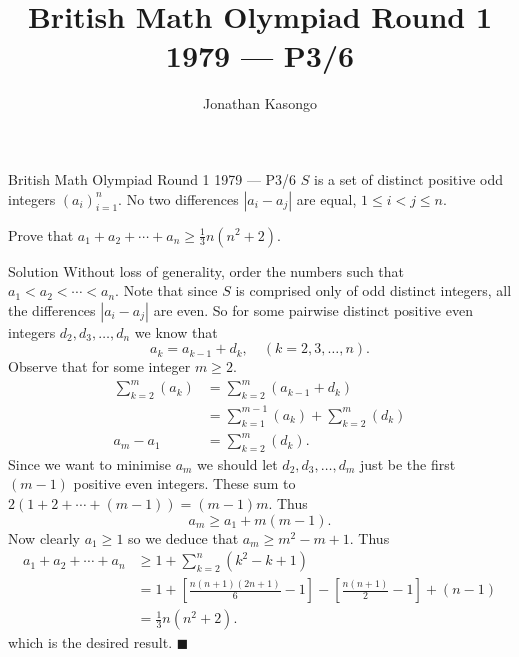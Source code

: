 \documentclass{article}
\author{Jonathan Kasongo}
\title{British Math Olympiad Round 1 1979 --- P3/6}
\begin{document}
\maketitle

\begin{problem}{British Math Olympiad Round 1 1979 --- P3/6}
$S$ is a set of distinct positive odd integers $(a_i)_{i=1}^n$. No
two differences $|a_i - a_j|$ are equal, $1 \leq i < j \leq n$.
\vspace{0.2cm}

Prove that $a_1 + a_2 + \cdots + a_n \geq \frac13 n (n^2 + 2)$.
\end{problem}

\begin{solution}{Solution}
Without loss of generality, order the numbers such that
$a_1 < a_2 < \cdots < a_n$.
Note that since $S$ is comprised only of odd distinct integers, all the
differences $|a_i - a_j|$ are even. So for some pairwise distinct positive
even integers $d_2, d_3, \ldots, d_n$ we know that
$$
a_k = a_{k-1} + d_k, \quad (k=2,3,\ldots,n).
$$
Observe that for some integer $m \geq 2$.
\[
\begin{aligned}
\sum_{k=2}^m (a_k) &= \sum_{k=2}^m (a_{k-1} + d_k) \\
&= \sum_{k=1}^{m-1} (a_k) + \sum_{k=2}^m (d_k) \\
a_m - a_1 &= \sum_{k=2}^m (d_k).
\end{aligned}
\]
Since we want to minimise $a_m$ we should let $d_2, d_3, \ldots, d_m$
just be the first $(m-1)$ positive even integers.
These sum to $2(1 + 2 + \cdots + (m-1)) = (m-1)m$. Thus
$$
a_m \geq a_1 + m(m-1).
$$
Now clearly $a_1 \geq 1$ so we deduce that
$a_m \geq m^2 - m + 1$. Thus
\[
\begin{aligned}
a_1 + a_2 + \cdots + a_n &\geq 1 + \sum_{k=2}^n (k^2 - k + 1) \\
&= 1 + \left[ \frac{n(n+1)(2n+1)}{6} - 1\right] -
\left[ \frac{n(n+1)}{2} - 1 \right] + (n-1) \\
&=\frac13 n(n^2 + 2).
\end{aligned}
\]
which is the desired result. $\blacksquare$
\end{solution}
\end{document}
